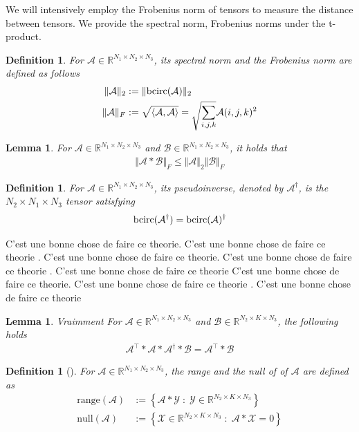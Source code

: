 \documentclass[11pt]{article}
\newtheorem{definition}[theorem]{Definition}
\newtheorem{lemma}[theorem]{Lemma}
\def\fm#1{\mathcal{#1}}
\def\r{\mathbb{R}}
\begin{document}
We will intensively employ the Frobenius norm of tensors to measure the distance between tensors. We  provide the spectral norm, Frobenius norms under the t-product.
\begin{definition}  For $\fm A \in \r^{N_1 \times N_2 \times N_3}$, its spectral norm and the Frobenius norm are defined as follows
\begin{align}
    \Vert \fm A \Vert_2 &  := \Vert \bcirc (\fm A ) \Vert_2\\
    \Vert \fm A \Vert_F &:= \sqrt{\langle \fm A , \fm A \rangle} = \sqrt{\sum_{i,j,k}}\fm A(i,j,k)^2
\end{align}
\end{definition}
\begin{lemma}
    For $\fm A\in \r^{N_1\times N_2 \times N_3}$ and $\fm B\in \r^{N_1\times N_2 \times N_3}$, it holds that 
    \begin{align}
        \Vert \fm A * \fm B \Vert_F\leq \Vert \fm A \Vert_2 \Vert \fm B \Vert_F
    \end{align}
\end{lemma}
\begin{definition} For $\fm A\in \r^{N_1\times N_2\times N_3}$, its pseudoinverse, denoted by $\fm A^\dagger$, is the $N_2\times N_1\times N_3$ tensor satisfying
\begin{align}
    \bcirc(\fm A^\dagger) = \bcirc(\fm A )^\dagger
\end{align}
\end{definition}
C'est une bonne chose de faire ce theorie. C'est une bonne chose de faire ce theorie . C'est une bonne chose de faire ce theorie.
C'est une bonne chose de faire ce theorie . C'est une bonne chose de faire ce theorie
C'est une bonne chose de faire ce theorie. C'est une bonne chose de faire ce theorie . C'est une bonne chose de faire ce theorie
\begin{lemma}\label{lem:lem-10}
Vraimment For $\fm A\in \r^{N_1\times N_2\times N_3}$ and  $\fm B\in \r^{N_2\times K\times N_3}$, the following holds
\begin{align}
\fm A^\top * \fm A * \fm A^\dagger * \fm B= \fm A^\top * \fm B
\end{align}
\end{lemma}
\begin{definition}[\cite{an2024randomized}] For $\fm A\in \r^{N_1\times N_2\times N_3}$, the range  and the null of of $\fm A$ are defined as 
\begin{align*}
    \text{range}(\fm A ) &:= \left\{\fm A * \fm Y\; :\; \fm Y\in \r^{N_2\times K\times N_3} \right\}\\
    \text{null}(\fm A) &:= \left\{ \fm X \in \r^{N_2\times K \times N_3 }\;:\; \fm A * \fm X = 0    \right\}
\end{align*}
\end{definition}
\end{document}
